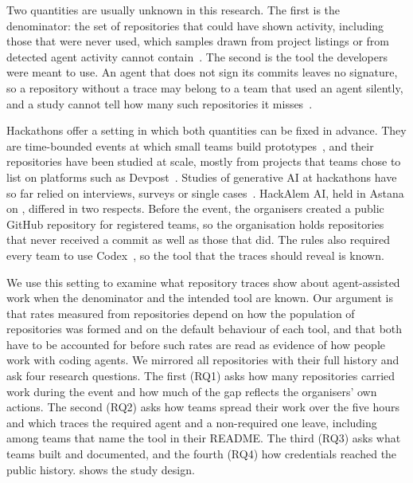 \documentclass{article}
\begin{document}
Two quantities are usually unknown in this research. The first is the denominator: the set of repositories that could have shown activity, including those that were never used, which samples drawn from project listings or from detected agent activity cannot contain~\cite{kalliamvakou2014perils,baltes2022sampling}. The second is the tool the developers were meant to use. An agent that does not sign its commits leaves no signature, so a repository without a trace may belong to a team that used an agent silently, and a study cannot tell how many such repositories it misses~\cite{robbes2026heuristics}.

Hackathons offer a setting in which both quantities can be fixed in advance. They are time-bounded events at which small teams build prototypes~\cite{chau2023hackathons}, and their repositories have been studied at scale, mostly from projects that teams chose to list on platforms such as Devpost~\cite{nolte2020hackathon,mcintosh2021hackathon,imam2021secretlife,mahmoud2022oneoff,halmans2026hackrep}. Studies of generative AI at hackathons have so far relied on interviews, surveys or single cases~\cite{zhou2026quickbuild,gama2025vibes,chen2026codeforall,sajja2024genaihack}. HackAlem AI, held in Astana on \eventdate, differed in two respects. Before the event, the organisers created a public GitHub repository for registered teams, so the organisation holds repositories that never received a commit as well as those that did. The rules also required every team to use Codex~\cite{hackalem2026site}, so the tool that the traces should reveal is known.

We use this setting to examine what repository traces show about agent-assisted work when the denominator and the intended tool are known. Our argument is that rates measured from repositories depend on how the population of repositories was formed and on the default behaviour of each tool, and that both have to be accounted for before such rates are read as evidence of how people work with coding agents. We mirrored all \NRqOneTotal{} repositories with their full history and ask four research questions. The first (RQ1) asks how many repositories carried work during the event and how much of the gap reflects the organisers' own actions. The second (RQ2) asks how teams spread their work over the five hours and which traces the required agent and a non-required one leave, including among teams that name the tool in their README. The third (RQ3) asks what teams built and documented, and the fourth (RQ4) how credentials reached the public history.  shows the study design.
\end{document}

